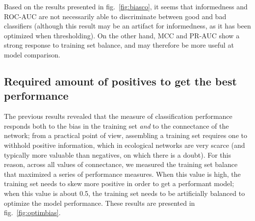 \documentclass[11pt]{article}
\begin{document}
Based on the results presented in fig.~\ref{fig:biasco}, it seems that
informedness and ROC-AUC are not necessarily able to discriminate
between good and bad classifiers (although this result may be an
artifact for informedness, as it has been optimized when thresholding).
On the other hand, MCC and PR-AUC show a strong response to training set
balance, and may therefore be more useful at model comparison.

\hypertarget{required-amount-of-positives-to-get-the-best-performance}{%
\subsection{Required amount of positives to get the best
performance}\label{required-amount-of-positives-to-get-the-best-performance}}

The previous results revealed that the measure of classification
performance responds both to the bias in the training set \emph{and} to
the connectance of the network; from a practical point of view,
assembling a training set requires one to withhold positive information,
which in ecological networks are very scarce (and typically more
valuable than negatives, on which there is a doubt). For this reason,
across all values of connectance, we measured the training set balance
that maximized a series of performance measures. When this value is
high, the training set needs to skew more positive in order to get a
performant model; when this value is about 0.5, the training set needs
to be artificially balanced to optimize the model performance. These
results are presented in fig.~\ref{fig:optimbias}.
\end{document}
